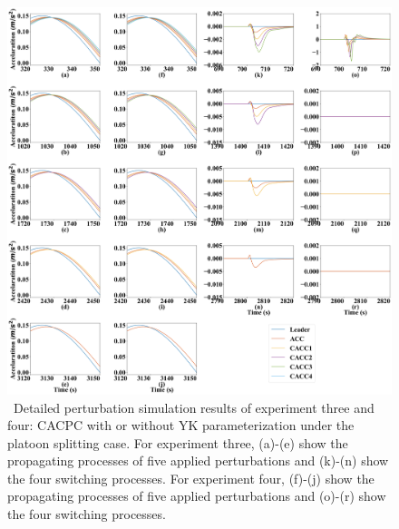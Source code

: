 \documentclass[a4paper,fleqn]{cas-sc}
\begin{document}
\begin{figure}
  \centering
  \includegraphics[width=14cm]{figs/split_detail.png}
  \caption{~Detailed perturbation simulation results of experiment three and four: CACPC with or without YK parameterization under the platoon splitting case. For experiment three, (a)-(e) show the propagating processes of five applied perturbations and (k)-(n) show the four switching processes. For experiment four, (f)-(j) show the propagating processes of five applied perturbations and (o)-(r) show the four switching processes.}
  \label{new4}
\end{figure}



\end{document}
